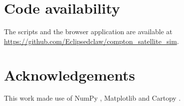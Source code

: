 \documentclass[a4paper,fleqn]{cas-sc}
\newif\ifshowtodos
\newcommand{\todo}[1]{\ifshowtodos{\color{red!70!black}\textbf{[TODO:} #1\textbf{]}}\fi}
\begin{document}
\section*{Code availability}
The scripts and the browser application are available at
\url{https://github.com/Eclipsedclaw/compton_satellite_sim}.
\todo{Add the web address of the hosted planner, a version number (the web
tool reports its version in the footer), the licence, and optionally a Zenodo
DOI for the archived release.}

\section*{Acknowledgements}
\todo{Funding (e.g.\ grant numbers), satellite operator, colleagues.} This work
made use of NumPy \cite{Harris2020}, Matplotlib \cite{Hunter2007} and Cartopy
\cite{Cartopy}.



\end{document}

